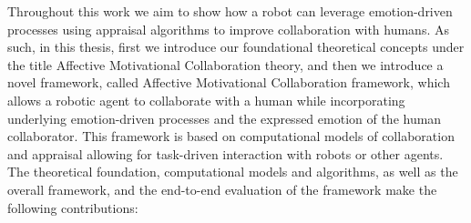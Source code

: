\documentclass[12pt]{report}
\begin{document}
Throughout this work we aim to show how a robot can leverage emotion-driven
processes using appraisal algorithms to improve collaboration with humans. As
such, in this thesis, first we introduce our foundational theoretical concepts
under the title Affective Motivational Collaboration theory, and then we
introduce a novel framework, called Affective Motivational Collaboration
framework, which allows a robotic agent to collaborate with a human while
incorporating underlying emotion-driven processes and the expressed emotion of
the human collaborator. This framework is based on computational models of
collaboration and appraisal allowing for task-driven interaction with robots or
other agents. The theoretical foundation, computational models and algorithms,
as well as the overall framework, and the end-to-end evaluation of the framework
make the following contributions:
\end{document}
